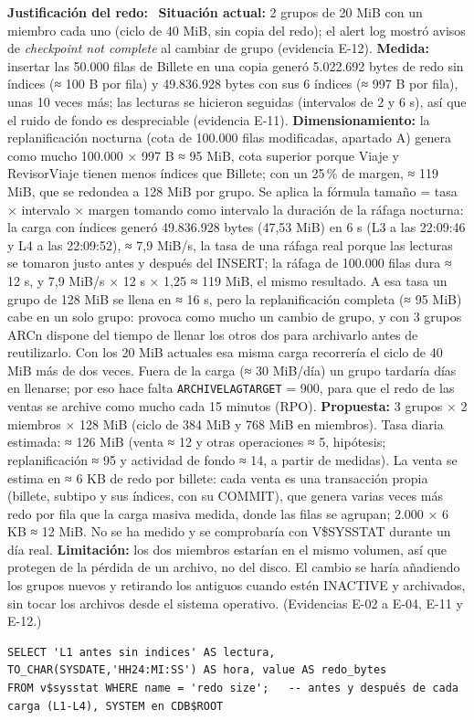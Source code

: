 \documentclass[11pt,a4paper]{article}
\DeclareRobustCommand{\_}{\textunderscore\allowbreak}
\newcommand{\tb}[1]{\texttt{#1}}
\newcommand{\campo}[1]{\textbf{#1:}~}                 %
\begin{document}
\campo{Justificación del redo} \textbf{Situación actual:} 2 grupos de 20 MiB con un miembro cada uno (ciclo de 40 MiB, sin copia del redo); el alert log mostró avisos de \emph{checkpoint not complete} al cambiar de grupo (evidencia E-12). \textbf{Medida:} insertar las 50.000 filas de Billete en una copia generó 5.022.692 bytes de redo sin índices (≈ 100 B por fila) y 49.836.928 bytes con sus 6 índices (≈ 997 B por fila), unas 10 veces más; las lecturas se hicieron seguidas (intervalos de 2 y 6 s), así que el ruido de fondo es despreciable (evidencia E-11). \textbf{Dimensionamiento:} la replanificación nocturna (cota de 100.000 filas modificadas, apartado A) genera como mucho 100.000 × 997 B ≈ 95 MiB, cota superior porque Viaje y Revisor\_Viaje tienen menos índices que Billete; con un 25\,\% de margen, ≈ 119 MiB, que se redondea a 128 MiB por grupo. Se aplica la fórmula tamaño = tasa × intervalo × margen tomando como intervalo la duración de la ráfaga nocturna: la carga con índices generó 49.836.928 bytes (47,53 MiB) en 6 s (L3 a las 22:09:46 y L4 a las 22:09:52), ≈ 7,9 MiB/s, la tasa de una ráfaga real porque las lecturas se tomaron justo antes y después del INSERT; la ráfaga de 100.000 filas dura ≈ 12 s, y 7,9 MiB/s × 12 s × 1,25 ≈ 119 MiB, el mismo resultado. A esa tasa un grupo de 128 MiB se llena en ≈ 16 s, pero la replanificación completa (≈ 95 MiB) cabe en un solo grupo: provoca como mucho un cambio de grupo, y con 3 grupos ARCn dispone del tiempo de llenar los otros dos para archivarlo antes de reutilizarlo. Con los 20 MiB actuales esa misma carga recorrería el ciclo de 40 MiB más de dos veces. Fuera de la carga (≈ 30 MiB/día) un grupo tardaría días en llenarse; por eso hace falta \tb{ARCHIVE\_LAG\_TARGET} = 900, para que el redo de las ventas se archive como mucho cada 15 minutos (RPO). \textbf{Propuesta:} 3 grupos × 2 miembros × 128 MiB (ciclo de 384 MiB y 768 MiB en miembros). Tasa diaria estimada: ≈ 126 MiB (venta ≈ 12 y otras operaciones ≈ 5, hipótesis; replanificación ≈ 95 y actividad de fondo ≈ 14, a partir de medidas). La venta se estima en ≈ 6 KB de redo por billete: cada venta es una transacción propia (billete, subtipo y sus índices, con su COMMIT), que genera varias veces más redo por fila que la carga masiva medida, donde las filas se agrupan; 2.000 × 6 KB ≈ 12 MiB. No se ha medido y se comprobaría con V\$SYSSTAT durante un día real. \textbf{Limitación:} los dos miembros estarían en el mismo volumen, así que protegen de la pérdida de un archivo, no del disco. El cambio se haría añadiendo los grupos nuevos y retirando los antiguos cuando estén INACTIVE y archivados, sin tocar los archivos desde el sistema operativo. (Evidencias E-02 a E-04, E-11 y E-12.)
\begin{lstlisting}
SELECT 'L1 antes sin indices' AS lectura, TO_CHAR(SYSDATE,'HH24:MI:SS') AS hora, value AS redo_bytes
FROM v$sysstat WHERE name = 'redo size';   -- antes y después de cada carga (L1-L4), SYSTEM en CDB$ROOT
\end{lstlisting}
\end{document}
